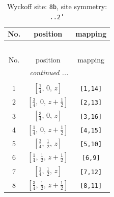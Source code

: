 \documentclass[fleqn,8pt]{jsarticle}
\begin{document}
\begin{longtable}{ccc}
\caption{Wyckoff site: {\tt 8b}, site symmetry: {\tt ..2'}}
 \\
 \hline \hline
No. & position & mapping \\ \hline \endfirsthead

\multicolumn{2}{l}{\tablename\ \thetable{}} \\
 \hline \hline
No. & position & mapping \\ \hline \endhead

 \hline \hline
\multicolumn{2}{r}{\footnotesize\it continued ...} \\ \endfoot

 \hline \hline
\multicolumn{2}{r}{} \\ \endlastfoot

1 & $\left[ \frac{1}{4},\, 0,\, z \right]$ & {\tt [1,14]} \\ \hline
2 & $\left[ \frac{3}{4},\, 0,\, z + \frac{1}{2} \right]$ & {\tt [2,13]} \\ \hline
3 & $\left[ \frac{3}{4},\, 0,\, z \right]$ & {\tt [3,16]} \\ \hline
4 & $\left[ \frac{1}{4},\, 0,\, z + \frac{1}{2} \right]$ & {\tt [4,15]} \\ \hline
5 & $\left[ \frac{3}{4},\, \frac{1}{2},\, z \right]$ & {\tt [5,10]} \\ \hline
6 & $\left[ \frac{1}{4},\, \frac{1}{2},\, z + \frac{1}{2} \right]$ & {\tt [6,9]} \\ \hline
7 & $\left[ \frac{1}{4},\, \frac{1}{2},\, z \right]$ & {\tt [7,12]} \\ \hline
8 & $\left[ \frac{3}{4},\, \frac{1}{2},\, z + \frac{1}{2} \right]$ & {\tt [8,11]} \\
\end{longtable}
\renewcommand{\arraystretch}{1.2}
\end{document}
